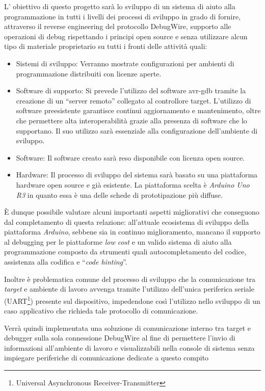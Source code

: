L' obiettivo di questo progetto sarà lo sviluppo di un sistema di aiuto alla programmazione in tutti i livelli dei processi di sviluppo in grado di fornire, attraverso il reverse engineering del protocollo DebugWire\cite{site:dw-reverse-engeneering}, supporto alle operazioni di debug rispettando i principi open source e senza utilizzare alcun tipo di materiale proprietario su tutti i fronti delle attività quali:
\begin{itemize}
    \item Sistemi di sviluppo: Verranno mostrate configurazioni per ambienti di programmazione distribuiti con licenze aperte. 
    \item Software di supporto: Si prevede l'utilizzo del software avr-gdb\cite{site:gdb} tramite la creazione di un ``server remoto'' collegato al controllore target. L'utilizzo di software preesistente garantisce continui aggiornamento e mantenimento, oltre che permettere alta interoperabilità grazie alla presenza di software che lo supportano. Il suo utilizzo sarà essenziale alla configurazione dell'ambiente di sviluppo.
    \item Software: Il software creato sarà reso disponibile con licenza open source.
    \item Hardware: Il processo di sviluppo del sistema sarà basato su una piattaforma hardware open source e già esistente. La piattaforma scelta è \textit{Arduino Uno R3} in quanto essa è una delle schede di prototipazione più diffuse.
\end{itemize}

È dunque possibile valutare alcuni importanti aspetti migliorativi che conseguono dal completamento di questa relazione: all'attuale ecosistema di sviluppo della piattaforma \textit{Arduino}, sebbene sia in continuo miglioramento, mancano il supporto al debugging per le piattaforme \textit{low cost} e un valido sistema di aiuto alla programmazione composto da strumenti quali autocompletamento del codice, assistenza alla codifica e ``\textit{code hinting}''.

Inoltre è problematica comune del processo di sviluppo che la comunicazione tra \textit{target} e ambiente di lavoro avvenga tramite l'utilizzo dell'unica periferica seriale (UART\footnote{Universal Asynchronous Receiver-Transmitter}) presente sul dispositivo, impedendone così l'utilizzo nello sviluppo di un caso applicativo che richieda tale protocollo di comunicazione.

Verrà quindi implementata una soluzione di comunicazione interno tra target e debugger sulla sola connessione DebugWire al fine di permettere l'invio di informazioni all'ambiente di lavoro e visualizzabili nella console di sistema senza impiegare periferiche di comunicazione dedicate a questo compito

